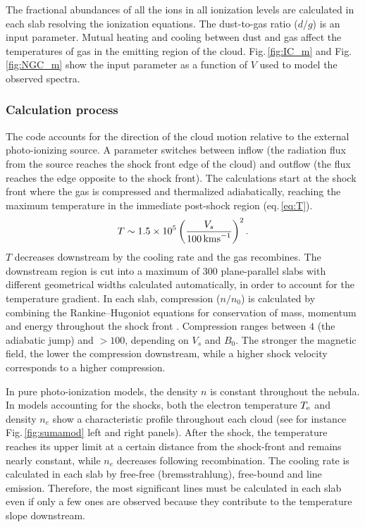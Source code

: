 \documentclass[../thesis.tex]{subfiles}
\begin{document}
The fractional abundances  of all the ions in all ionization levels are calculated  in each slab resolving the ionization equations.
The dust-to-gas ratio ($d/g$)  is an input parameter. 
Mutual heating and cooling between dust and gas affect the temperatures of gas in the emitting region of the cloud.
Fig.\,\ref{fig:IC_m} and Fig.\,\ref{fig:NGC_m} show the input parameter as a function of $V$ used to model the observed spectra.

\subsubsection{Calculation process}

The code accounts for the direction of the cloud motion relative to the external photo-ionizing source.  
A parameter switches between inflow (the radiation flux from the source reaches the shock front edge of the cloud) and outflow (the flux reaches the edge opposite to the shock front).
The calculations start at the shock front where the gas is compressed and thermalized adiabatically, reaching the maximum temperature in the immediate post-shock region (eq.\,\ref{eq:T}).
\begin{equation}
\label{eq:T}
T\sim 1.5 \times 10^5 \left(\frac{V_s}{100\,\si{\kms}}\right)^2. 
\end{equation}
$T$ decreases downstream by the cooling rate and the gas recombines. 
The downstream region is cut into a maximum of 300 plane-parallel slabs with different geometrical widths calculated automatically, in order to account for the temperature gradient.
In each slab, compression ($n/n_0$) is calculated by combining the Rankine--Hugoniot equations for conservation of mass, momentum and energy throughout the shock front \citep{Cox72}.
Compression ranges between $4$ (the adiabatic jump) and $> 100$, depending on $V_s$ and $B_0$. 
The stronger the magnetic field, the lower the compression downstream, while a higher shock velocity corresponds to a higher compression.

In pure photo-ionization models, the density $n$ is constant throughout the nebula.
In models accounting for the shocks, both the electron temperature  $T_{\rm e}$  and  density $n_e$ show a characteristic profile throughout each cloud (see for instance Fig.\,\ref{fig:sumamod} left and right panels). 
After the shock, the temperature reaches its upper limit at a certain distance from the shock-front and remains nearly constant, while $n_e$ decreases following recombination.
The cooling rate is calculated in each slab by free-free (bremsstrahlung), free-bound and line emission. 
Therefore, the most significant lines must be calculated in each slab even if only a few ones are observed because they contribute to the temperature slope downstream.
\end{document}
